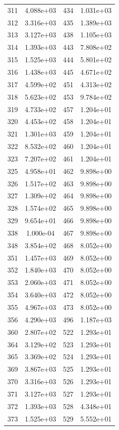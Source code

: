 \documentclass[12pt]{article}
\begin{document}
\begin{longtable}{@{}cccc@{}}
311 & 4.088e+03 & 434 & 1.031e+03 \\
312 & 3.316e+03 & 435 & 1.389e+03 \\
313 & 3.127e+03 & 438 & 1.105e+03 \\
314 & 1.393e+03 & 443 & 7.808e+02 \\
315 & 1.525e+03 & 444 & 5.801e+02 \\
316 & 1.438e+03 & 445 & 4.671e+02 \\
317 & 4.599e+02 & 451 & 4.313e+02 \\
318 & 5.623e+02 & 453 & 9.784e+02 \\
319 & 4.733e+02 & 457 & 1.204e+01 \\
320 & 4.453e+02 & 458 & 1.204e+01 \\
321 & 1.301e+03 & 459 & 1.204e+01 \\
322 & 8.532e+02 & 460 & 1.204e+01 \\
323 & 7.207e+02 & 461 & 1.204e+01 \\
325 & 4.958e+01 & 462 & 9.898e+00 \\
326 & 1.517e+02 & 463 & 9.898e+00 \\
327 & 1.309e+02 & 464 & 9.898e+00 \\
328 & 1.574e+02 & 465 & 9.898e+00 \\
329 & 9.654e+01 & 466 & 9.898e+00 \\
338 & 1.000e-04 & 467 & 9.898e+00 \\
348 & 3.854e+02 & 468 & 8.052e+00 \\
351 & 1.457e+03 & 469 & 8.052e+00 \\
352 & 1.840e+03 & 470 & 8.052e+00 \\
353 & 2.060e+03 & 471 & 8.052e+00 \\
354 & 3.640e+03 & 472 & 8.052e+00 \\
355 & 4.967e+03 & 473 & 8.052e+00 \\
356 & 4.290e+03 & 496 & 1.187e+03 \\
360 & 2.807e+02 & 522 & 1.293e+01 \\
364 & 3.129e+02 & 523 & 1.293e+01 \\
365 & 3.369e+02 & 524 & 1.293e+01 \\
369 & 3.867e+03 & 525 & 1.293e+01 \\
370 & 3.316e+03 & 526 & 1.293e+01 \\
371 & 3.127e+03 & 527 & 1.293e+01 \\
372 & 1.393e+03 & 528 & 4.348e+01 \\
373 & 1.525e+03 & 529 & 5.552e+01 \\

\end{longtable}
\end{document}
